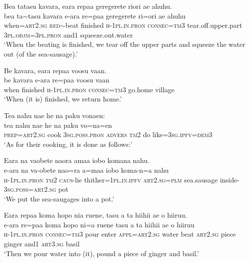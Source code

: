 \ea\label{ex:text32-16}
Bea tatasu kavara, eara repaa geregerete riori ae ahuhu.\\
\gll bea	ta{$\sim$}tasu	kavara	e-ara	re=paa	geregerete	ri=ori	ae	ahuhu\\
     when=\textsc{art}2.\textsc{sg}	\textsc{red}{$\sim$}beat	finished	\textsc{h}-1\textsc{pl}.\textsc{in}.\textsc{pron}	\textsc{consec}=\textsc{tm}3	tear.off.upper.part	3\textsc{pl}.\textsc{objm}=3\textsc{pl}.\textsc{pron}	and1	squeeze.out.water\\
\glt `When the beating is finished, we tear off the upper parts and squeeze the water out (of the sea-sausage).'
\z

\ea\label{ex:text32-17}
Be kavara, eara repaa voosu vaan.\\
\gll be	kavara	e-ara	re=paa	voosu	vaan\\
     when	finished	\textsc{h}-1\textsc{pl}.\textsc{in}.\textsc{pron}	\textsc{consec}=\textsc{tm}3	go.home	village\\
\glt `When (it is) finished, we return home.'
\z

\ea\label{ex:text32-18}
Tea nahu nae he na paku vonaen:\\
\gll tea	nahu	nae	he	na	paku	vo=na=en\\
     \textsc{prep}=\textsc{art}2.\textsc{sg}	cook	3\textsc{sg}.\textsc{poss}.\textsc{pron}	\textsc{advers}	\textsc{tm}2	do	like=3\textsc{sg}.\textsc{ipfv}=\textsc{dem}3\\
\glt `As for their cooking, it is done as follows:'
\z

\ea\label{ex:text32-19}
Eara na vaobete naora amaa iobo komana nahu.\\
\gll e-ara	na	va-obete	nao=ra	a=maa	iobo	koma-n=a	nahu\\
     \textsc{h}-1\textsc{pl}.\textsc{in}.\textsc{pron}	\textsc{tm}2	\textsc{caus}-lie	thither=1\textsc{pl}.\textsc{in}.\textsc{ipfv}	\textsc{art}2.\textsc{sg}=\textsc{plm}	sea.sausage	inside-3\textsc{sg}.\textsc{poss}=\textsc{art}2.\textsc{sg}	pot\\
\glt `We put the sea-saugages into a pot.'
\z

\ea\label{ex:text32-20}
Eara repaa koma hopo nia ruene, tasu a ta hiihii ae o hiiruu.\\
\gll e-ara	re=paa	koma	hopo	ni=a	ruene	tasu	a	ta	hiihii	ae	o	hiiruu\\
     \textsc{h}-1\textsc{pl}.\textsc{in}.\textsc{pron}	\textsc{consec}=\textsc{tm}3	pour	enter	\textsc{appl}=\textsc{art}2.\textsc{sg}	water	beat	\textsc{art}2.\textsc{sg}	piece	ginger	and1	\textsc{art}3.\textsc{sg}	basil\\
\glt `Then we pour water into (it), pound a piece of ginger and basil.'
\z

